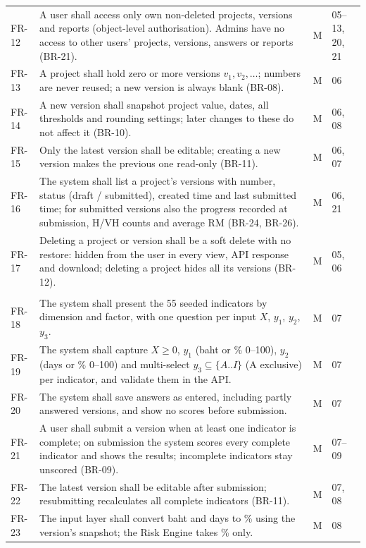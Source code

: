 \documentclass[11pt,a4paper]{article}
\newcommand{\RM}{\mathrm{RM}}
\begin{document}
\begin{longtable}{@{}l R{11.2cm} c l@{}}
FR-12 & A user shall access only own non-deleted projects, versions and reports (object-level authorisation). Admins have no access to other users' projects, versions, answers or reports (BR-21). & M & 05--13, 20, 21 \\
FR-13 & A project shall hold zero or more versions $v_1, v_2, \dots$; numbers are never reused; a new version is always blank (BR-08). & M & 06 \\
FR-14 & A new version shall snapshot project value, dates, all thresholds and rounding settings; later changes to these do not affect it (BR-10). & M & 06, 08 \\
FR-15 & Only the latest version shall be editable; creating a new version makes the previous one read-only (BR-11). & M & 06, 07 \\
FR-16 & The system shall list a project's versions with number, status (draft / submitted), created time and last submitted time; for submitted versions also the progress recorded at submission, H/VH counts and average $\RM$ (BR-24, BR-26). & M & 06, 21 \\
FR-17 & Deleting a project or version shall be a soft delete with no restore: hidden from the user in every view, API response and download; deleting a project hides all its versions (BR-12). & M & 05, 06 \\
\\
FR-18 & The system shall present the 55 seeded indicators by dimension and factor, with one question per input $X$, $y_1$, $y_2$, $y_3$. & M & 07 \\
FR-19 & The system shall capture $X \ge 0$, $y_1$ (baht or \% 0--100), $y_2$ (days or \% 0--100) and multi-select $y_3\subseteq\{A..I\}$ (A exclusive) per indicator, and validate them in the API. & M & 07 \\
FR-20 & The system shall save answers as entered, including partly answered versions, and show no scores before submission. & M & 07 \\
FR-21 & A user shall submit a version when at least one indicator is complete; on submission the system scores every complete indicator and shows the results; incomplete indicators stay unscored (BR-09). & M & 07--09 \\
FR-22 & The latest version shall be editable after submission; resubmitting recalculates all complete indicators (BR-11). & M & 07, 08 \\
FR-23 & The input layer shall convert baht and days to \% using the version's snapshot; the Risk Engine takes \% only. & M & 08 \\

\end{longtable}
\end{document}
